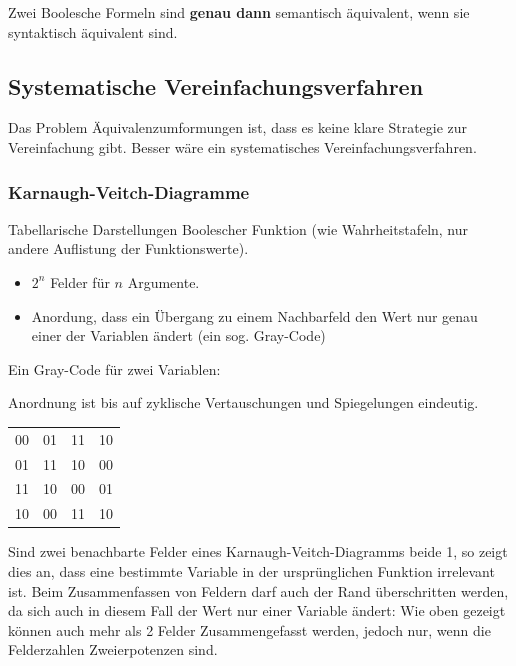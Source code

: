\documentclass[12pt]{report}
\begin{document}
\begin{center}
  Zwei Boolesche Formeln sind \textbf{genau dann} semantisch äquivalent, wenn sie syntaktisch äquivalent sind.
\end{center}


\subsection{Systematische Vereinfachungsverfahren}
Das Problem Äquivalenzumformungen ist, dass es keine klare Strategie zur Vereinfachung gibt.
Besser wäre ein systematisches Vereinfachungsverfahren.

\subsubsection{Karnaugh-Veitch-Diagramme}
\begin{defbox}
  Tabellarische Darstellungen Boolescher
  Funktion (wie Wahrheitstafeln, nur andere Auflistung der Funktionswerte).
  \begin{itemize}
    \item $2^n$ Felder für $n$ Argumente.
    \item Anordung, dass ein Übergang zu einem Nachbarfeld den Wert nur genau einer der Variablen ändert (ein sog. Gray-Code)
  \end{itemize}
\end{defbox}

\begin{exbox}
  \begin{minipage}{0.6\textwidth}
    Ein Gray-Code für zwei Variablen:

    Anordnung ist bis auf zyklische Vertauschungen und Spiegelungen eindeutig.
  \end{minipage}
  \hfill
  \begin{minipage}{0.3\textwidth}
    \begin{tabular}{cccc}
      00 & 01 & 11 & 10 \\
      01 & 11 & 10 & 00 \\
      11 & 10 & 00 & 01 \\
      10 & 00 & 11 & 10 \\
    \end{tabular}
  \end{minipage}
\end{exbox}
Sind zwei benachbarte Felder eines Karnaugh-Veitch-Diagramms beide 1, so zeigt dies an, dass eine bestimmte Variable in der ursprünglichen Funktion irrelevant ist.
Beim Zusammenfassen von Feldern darf auch der Rand überschritten werden, da sich auch in diesem Fall der Wert nur einer Variable ändert:
Wie oben gezeigt können auch mehr als 2 Felder Zusammengefasst werden, jedoch nur, wenn die Felderzahlen Zweierpotenzen sind.
\end{document}

